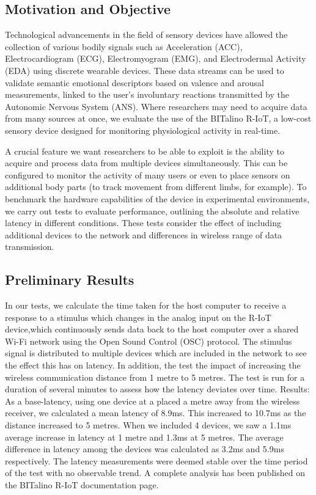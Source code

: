 \subsection{Motivation and Objective}

Technological advancements in the field of sensory devices have allowed the collection of various bodily signals such as Acceleration (ACC), Electrocardiogram (ECG), Electromyogram (EMG), and Electrodermal Activity (EDA) using discrete wearable devices. These data streams can be used to validate semantic emotional descriptors based on valence and arousal measurements, linked to the user’s involuntary reactions transmitted by the Autonomic Nervous System (ANS). Where researchers may need to acquire data from many sources at once, we evaluate the use of the BITalino R-IoT, a low-cost sensory device designed for monitoring physiological activity in real-time.

A crucial feature we want researchers to be able to exploit is the ability to acquire and process data from multiple devices simultaneously. This can be configured to monitor the activity of many users or even to place sensors on additional body parts (to track movement from different limbs, for example). To benchmark the hardware capabilities of the device in experimental environments, we carry out tests to evaluate performance, outlining the absolute and relative latency in different conditions. These tests consider the effect of including additional devices to the network and differences in wireless range of data transmission.

\subsection{Preliminary Results}

In our tests, we calculate the time taken for the host computer to receive a response to a stimulus which changes in the analog input on the R-IoT device,which continuously sends data back to the host computer over a shared Wi-Fi network using the Open Sound Control (OSC) protocol. The stimulus signal is distributed to multiple devices which are included in the network to see the effect this has on latency. In addition, the test the impact of increasing the wireless communication distance from 1 metre to 5 metres. The test is run for a duration of several minutes to assess how the latency deviates over time.
Results: As a base-latency, using one device at a placed a metre away from the wireless receiver, we calculated a mean latency of 8.9ms. This increased to 10.7ms as the distance increased to 5 metres. When we included 4 devices, we saw a 1.1ms average increase in latency at 1 metre and 1.3ms at 5 metres. The average difference in latency among the devices was calculated as 3.2ms and 5.9ms respectively. The latency measurements were deemed stable over the time period of the test with no observable trend. A complete analysis has been published on the BITalino R-IoT documentation page.

